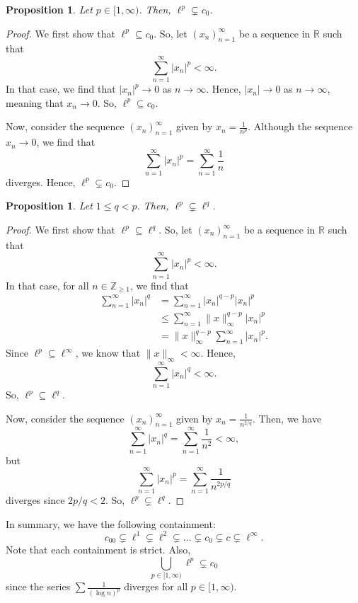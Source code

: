 \documentclass[a4paper, openany]{memoir}
\theoremstyle{definition}
\theoremstyle{plain}
\newtheorem{proposition}[definition]{Proposition}
\begin{document}
    \begin{proposition}
        Let $p \in [1, \infty)$. Then, $\ell^p \subsetneq c_0$.
    \end{proposition}
    \begin{proof}
        We first show that $\ell^p \subseteq c_0$. So, let $(x_n)_{n=1}^\infty$ be a sequence in $\mathbb{R}$ such that
        \[\sum_{n=1}^\infty |x_n|^p < \infty.\]
        In that case, we find that $|x_n|^p \to 0$ as $n \to \infty$. Hence, $|x_n| \to 0$ as $n \to \infty$, meaning that $x_n \to 0$. So, $\ell^p \subseteq c_0$.

        Now, consider the sequence $(x_n)_{n=1}^\infty$ given by $x_n = \frac{1}{n^p}$. Although the sequence $x_n \to 0$, we find that
        \[\sum_{n=1}^\infty |x_n|^p = \sum_{n=1}^\infty \frac{1}{n}\]
        diverges. Hence, $\ell^p \subsetneq c_0$.
    \end{proof}

    \begin{proposition}
        Let $1 \leq q < p$. Then, $\ell^p \subsetneq \ell^q$.
    \end{proposition}
    \begin{proof}
        We first show that $\ell^p \subseteq \ell^q$. So, let $(x_n)_{n=1}^\infty$ be a sequence in $\mathbb{R}$ such that
        \[\sum_{n=1}^\infty |x_n|^p < \infty.\]
        In that case, for all $n \in \mathbb{Z}_{\geq 1}$, we find that
        \begin{align*}
            \sum_{n=1}^\infty |x_n|^q &= \sum_{n=1}^\infty |x_n|^{q-p} |x_n|^{p} \\
            &\leq \sum_{n=1}^\infty \lVert x \rVert_\infty^{q-p} |x_n|^p \\
            &= \lVert x \rVert_\infty^{q-p} \sum_{n=1}^\infty |x_n|^p.
        \end{align*}
        Since $\ell^p \subseteq \ell^\infty$, we know that $\lVert x \rVert_\infty < \infty$. Hence, 
        \[\sum_{n=1}^\infty |x_n|^q < \infty.\]
        So, $\ell^p \subseteq \ell^q$.

        Now, consider the sequence $(x_n)_{n=1}^\infty$ given by $x_n = \frac{1}{n^{2/q}}$. Then, we have
        \[\sum_{n=1}^\infty |x_n|^q = \sum_{n=1}^\infty \frac{1}{n^2} < \infty,\]
        but
        \[\sum_{n=1}^\infty |x_n|^p = \sum_{n=1}^\infty \frac{1}{n^{2p/q}}\]
        diverges since $2p/q < 2$. So, $\ell^p \subsetneq \ell^q$.
    \end{proof}
    
    In summary, we have the following containment:
    \[c_{00} \subsetneq \ell^1 \subsetneq \ell^2 \subsetneq \dots \subsetneq c_0 \subsetneq c \subsetneq \ell^\infty.\]
    Note that each containment is strict. Also,
    \[\bigcup_{p \in [1, \infty)} \ell^p \subsetneq c_0\]
    since the series $\sum \frac{1}{(\log n)^p}$ diverges for all $p \in [1, \infty)$.
    \newpage
\end{document}
